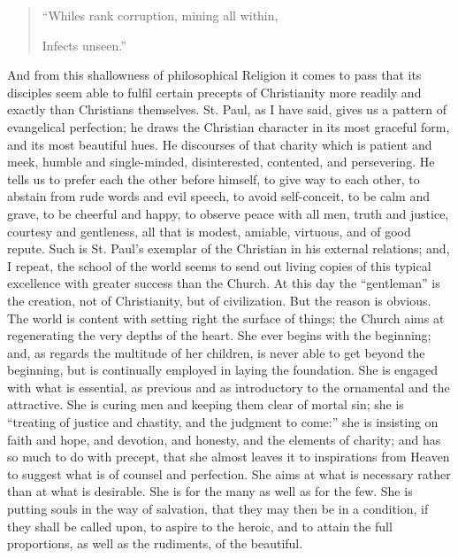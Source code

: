 \begin{quote}

``Whiles rank corruption, mining all within,

Infects unseen.''

\end{quote}

And from this shallowness of philosophical Religion it comes to
pass that its disciples seem able to fulfil certain precepts of
Christianity more readily and exactly than Christians
themselves. St. Paul, as I have said, gives us a pattern of
evangelical perfection; he draws the Christian character in its most
graceful form, and its most beautiful hues. He discourses of that
charity which is patient and meek, humble and single-minded,
disinterested, contented, and persevering. He tells us to prefer each
the other before himself, to give way to each other, to abstain from
rude words and evil speech, to avoid self-conceit, to be calm and
grave, to be cheerful and happy, to observe peace with all men, truth
and justice, courtesy and gentleness, all that is modest, amiable,
virtuous, and of good repute. Such is St. Paul's exemplar of the
Christian in his external relations; and, I repeat, the school of the
world seems to send out living copies of this typical excellence with
greater success than the Church. At this day the ``gentleman''
is the creation, not of Christianity, but of civilization. But the
reason is obvious. The world is content with setting right the surface
of things; the Church aims at regenerating the very depths of the
heart. She ever begins with the beginning; and, as regards the
multitude of her children, is never able to get beyond the beginning,
but is continually employed in laying the foundation. She is engaged
with what is essential, as previous and as introductory to the
ornamental and the attractive. She is curing men and keeping them
clear of mortal sin; she is ``treating of justice and chastity,
and the judgment to come:'' she is insisting on faith and hope,
and devotion, and honesty, and the elements of charity; and has so
much to do with precept, that she almost leaves it to inspirations
from Heaven to suggest what is of counsel and perfection. She aims at
what is necessary rather than at what is desirable. She is for the
many as well as for the few. She is putting souls in the way of
salvation, that they may then be in a condition, if they shall
be called upon, to aspire to the heroic, and to attain the full
proportions, as well as the rudiments, of the beautiful.

